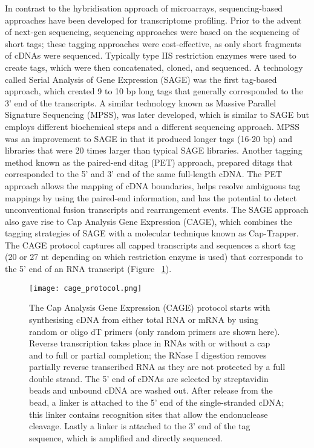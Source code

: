 In contrast to the hybridisation approach of microarrays, sequencing-based approaches have been developed for transcriptome profiling. Prior to the advent of next-gen sequencing, sequencing approaches were based on the sequencing of short tags; these tagging approaches were cost-effective, as only short fragments of cDNAs were sequenced. Typically type IIS restriction enzymes were used to create tags, which were then concatenated, cloned, and sequenced. A technology called Serial Analysis of Gene Expression (SAGE)\cite{pmid7570003} was the first tag-based approach, which created 9 to 10 bp long tags that generally corresponded to the 3' end of the transcripts. A similar technology known as Massive Parallel Signature Sequencing (MPSS), was later developed, which is similar to SAGE but employs different biochemical steps and a different sequencing approach\cite{pmid10835600}. MPSS was an improvement to SAGE in that it produced longer tags (16-20 bp) and libraries that were 20 times larger than typical SAGE libraries\cite{pmid10835600}. Another tagging method known as the paired-end ditag (PET) approach, prepared ditags that corresponded to the 5’ and 3’ end of the same full-length cDNA\cite{pmid15782207}. The PET approach allows the mapping of cDNA boundaries, helps resolve ambiguous tag mappings by using the paired-end information, and has the potential to detect unconventional fusion transcripts and rearrangement events. The SAGE approach also gave rise to Cap Analysis Gene Expression (CAGE)\cite{pmid14663149}, which combines the tagging strategies of SAGE with a molecular technique known as Cap-Trapper\cite{pmid8938445,pmid9179497}. The CAGE protocol captures all capped transcripts and sequences a short tag (20 or 27 nt depending on which restriction enzyme is used) that corresponds to the 5' end of an RNA transcript (Figure ~\ref{fig:cage_protocol}).

\begin{figure}[!ht]
   \centering
   \texttt{[image: cage\_protocol.png]}
   \caption[Cap Analysis Gene Expression protocol]{The Cap Analysis Gene Expression (CAGE) protocol starts with synthesising cDNA from either total RNA or mRNA by using random or oligo dT primers (only random primers are shown here). Reverse transcription takes place in RNAs with or without a cap and to full or partial completion; the RNase I digestion removes partially reverse transcribed RNA as they are not protected by a full double strand. The 5' end of cDNAs are selected by streptavidin beads and unbound cDNA are washed out. After release from the bead, a linker is attached to the 5' end of the single-stranded cDNA; this linker contains recognition sites that allow the endonuclease cleavage. Lastly a linker is attached to the 3' end of the tag sequence, which is amplified and directly sequenced.}
   \label{fig:cage_protocol}
\end{figure}

